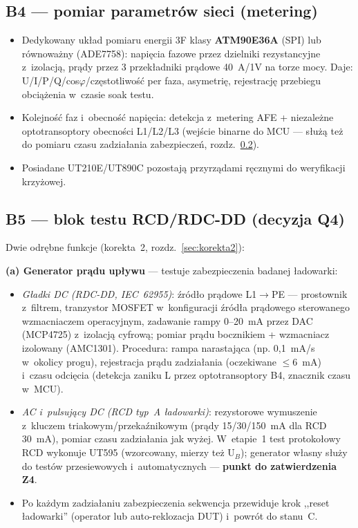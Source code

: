 \documentclass[11pt,a4paper]{article}
\begin{document}
\subsection{B4 --- pomiar parametrów sieci (metering)}
\label{sec:b4}

\begin{itemize}
\item Dedykowany układ pomiaru energii 3F klasy \textbf{ATM90E36A} (SPI) lub równoważny (ADE7758): napięcia fazowe przez dzielniki rezystancyjne z~izolacją, prądy przez 3 przekładniki prądowe 40~A/1V na torze mocy. Daje: U/I/P/Q/cos$\varphi$/częstotliwość per faza, asymetrię, rejestrację przebiegu obciążenia w~czasie soak testu.
\item Kolejność faz i~obecność napięcia: detekcja z~metering AFE + niezależne optotransoptory obecności L1/L2/L3 (wejście binarne do MCU --- służą też do pomiaru czasu zadziałania zabezpieczeń, rozdz.~\ref{sec:b5}).
\item Posiadane UT210E/UT890C pozostają przyrządami ręcznymi do weryfikacji krzyżowej.
\end{itemize}

\subsection{B5 --- blok testu RCD/RDC-DD (decyzja Q4)}
\label{sec:b5}

Dwie odrębne funkcje (korekta~2, rozdz.~\ref{sec:korekta2}):

\textbf{(a) Generator prądu upływu} --- testuje zabezpieczenia badanej ładowarki:
\begin{itemize}
\item \emph{Gładki DC (RDC-DD, IEC~62955)}: źródło prądowe L1$\rightarrow$PE --- prostownik z~filtrem, tranzystor MOSFET w~konfiguracji źródła prądowego sterowanego wzmacniaczem operacyjnym, zadawanie rampy 0--20~mA przez DAC (MCP4725) z~izolacją cyfrową; pomiar prądu bocznikiem + wzmacniacz izolowany (AMC1301). Procedura: rampa narastająca (np. 0,1~mA/s w~okolicy progu), rejestracja prądu zadziałania (oczekiwane $\le$6~mA) i~czasu odcięcia (detekcja zaniku L przez optotransoptory B4, znacznik czasu w~MCU).
\item \emph{AC i~pulsujący DC (RCD typ~A ładowarki)}: rezystorowe wymuszenie z~kluczem triakowym/przekaźnikowym (prądy 15/30/150~mA dla RCD 30~mA), pomiar czasu zadziałania jak wyżej. W~etapie~1 test protokołowy RCD wykonuje UT595 (wzorcowany, mierzy też U$_B$); generator własny służy do testów przesiewowych i~automatycznych --- \textbf{punkt do zatwierdzenia Z4}.
\item Po każdym zadziałaniu zabezpieczenia sekwencja przewiduje krok ,,reset ładowarki'' (operator lub auto-reklozacja DUT) i~powrót do stanu~C.
\end{itemize}
\end{document}

